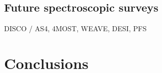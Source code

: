 \documentclass[modern, letterpaper]{aastex61}
\newcommand{\gaia}{\project{Gaia}}
\newcommand{\dex}{\ensuremath{{\rm dex}}}
\newcommand{\smoh}[1]{\textcolor{mediumpersianblue}{SO:#1}}
\begin{document}



\subsection{Future spectroscopic surveys} \label{sec:future-rvs}

DISCO / AS4, 4MOST, WEAVE, DESI, PFS

\section{Conclusions}
\end{document}
